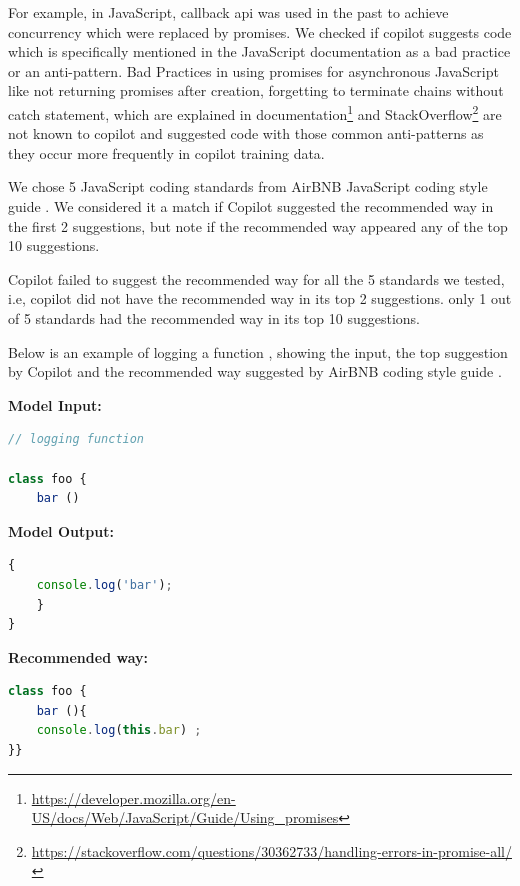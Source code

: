 For example, in JavaScript, callback api was used in the past to achieve concurrency which were replaced by promises. We checked if copilot suggests code which is specifically mentioned in the JavaScript documentation as a bad practice or an anti-pattern. Bad Practices in using promises for asynchronous JavaScript like not returning promises after creation, forgetting to terminate chains without catch statement, which are explained in documentation\footnote{\url{https://developer.mozilla.org/en-US/docs/Web/JavaScript/Guide/Using_promises}} and StackOverflow\footnote{\url{https://stackoverflow.com/questions/30362733/handling-errors-in-promise-all/}} are not known to copilot and suggested code with those common anti-patterns as they occur more frequently in copilot training data.

We chose 5 JavaScript coding standards from AirBNB JavaScript coding style guide \cite{airbnb_code}. We considered it a match if Copilot suggested the recommended way in the first 2 suggestions, but note if the recommended way appeared any of the top 10 suggestions. 

Copilot failed to suggest the recommended way for all the 5 standards we tested, i.e, copilot did not have the recommended way in its top 2 suggestions. only 1 out of 5 standards had the recommended way in its top 10 suggestions. 

Below is an example of logging a function , showing the input, the top suggestion by Copilot and the recommended way suggested by AirBNB coding style guide \cite{airbnb_code}.

\begin{tcolorbox}[title=Logging a Function,boxsep=.5mm]
\textbf{Model Input:}
\begin{lstlisting}[language=JavaScript]
// logging function

class foo {
    bar ()
\end{lstlisting}
\tcbline
\textbf{Model Output:}
\begin{lstlisting}[language=JavaScript]
{
    console.log('bar');
    }
}
\end{lstlisting}
\tcbline
\textbf{Recommended way:}
\begin{lstlisting}[language=JavaScript]
class foo {
    bar (){ 
    console.log(this.bar) ;
}}
\end{lstlisting}
\end{tcolorbox}
